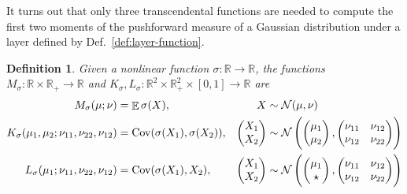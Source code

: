 \documentclass{article}
\newtheorem{definition}{Definition}
\DeclareMathOperator{\expect}{\mathbb{E}}
\DeclareMathOperator{\Cov}{\operatorname{Cov}}
\begin{document}
It turns out that only three transcendental functions are needed to compute the first two moments of the pushforward measure of a Gaussian distribution under a layer defined by Def.~\ref{def:layer-function}.
\begin{definition}
  \label{def:moment-maps}
  Given a nonlinear function \(\sigma: \mathbb{R} \to \mathbb R\),
  the functions \(M_\sigma: \mathbb{R}  \times \mathbb{R}_+ \to
  \mathbb{R}\) and \(K_\sigma, L_\sigma: \mathbb{R}^2 \times \mathbb
  R_+^2 \times [0, 1] \to \mathbb{R}\) are
  \begin{align*}
    M_\sigma(\mu; \nu) &= \expect{\sigma(X)},
    & X &\sim \mathcal N(\mu, \nu)
    \\
    K_\sigma(\mu_1, \mu_2; \nu_{11}, \nu_{22}, \nu_{12}) &= \Cov
    (\sigma(X_1), \sigma(X_2)),
    &
    \begin{pmatrix}
      X_1 \\ X_2
    \end{pmatrix} &\sim \mathcal N\del{
      \begin{pmatrix}
        \mu_1 \\ \mu_2
      \end{pmatrix},
      \begin{pmatrix}
        \nu_{11} & \nu_{12} \\
        \nu_{12} & \nu_{22}
      \end{pmatrix}
    }
    \\
    L_\sigma(\mu_1; \nu_{11}, \nu_{22}, \nu_{12}) &= \Cov
    (\sigma(X_1), X_2),
    &
    \begin{pmatrix}
      X_1 \\ X_2
    \end{pmatrix} &\sim \mathcal N\del{
      \begin{pmatrix}
        \mu_1 \\ \star
      \end{pmatrix},
      \begin{pmatrix}
        \nu_{11} & \nu_{12} \\
        \nu_{12} & \nu_{22}
      \end{pmatrix}
    }
    \\
  \end{align*}
\end{definition}
\end{document}
